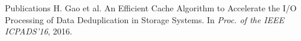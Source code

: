 \documentclass{resume} %
\begin{document}


%
%
%
%

\begin{rSection}{Publications}
H. Gao et al. An Efficient Cache Algorithm to Accelerate the I/O Processing of Data Deduplication in Storage Systems. In \textit{Proc. of the IEEE ICPADS’16}, 2016.
\end{rSection}

%




\end{document}
